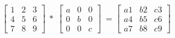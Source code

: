 \documentclass[12 pt]{slides}
\begin{document}
\begingroup
\[\begin{bmatrix}1 & 2 & 3\\4 & 5 & 6\\7 & 8 & 9\end{bmatrix}\ *\ \begin{bmatrix}a & 0 & 0\\0 & b & 0\\0 & 0 & c\end{bmatrix}\ =
  \begin{bmatrix}a1 & b2 & c3\\a4 & b5 & c6\\a7 & b8 & c9\end{bmatrix}\]
\endgroup
\end{document}
